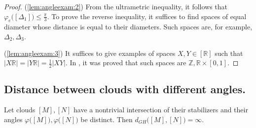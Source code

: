 \documentclass[leqno]{article}
\begin{document}
\begin{proof}
    (\ref{lem:angleexam:2}) From the ultrametric inequality, it follows that \(
    \varphi_e \big([\Delta _1]\big)\le \frac{\pi }{3} \). To prove the reverse
    inequality, it suffices to find spaces of equal diameter whose distance is
    equal to their diameters. Such spaces are, for example, \( \Delta
    _2, \Delta _3 \).

    (\ref{lem:angleexam:3}) It suffices to give examples of spaces \( X,Y\in
    [\mathbb{R}] \) such that \( |X \mathbb{R}| = |Y \mathbb{R}| = \frac 1 2
    |XY|. \) In \cite{mikhailovUnreleased}, it was proved that such
    spaces are \( \mathbb{Z}, \mathbb{R}\times
    [0,1] \).

\end{proof}
\subsection{Distance between clouds with different angles.}
\begin{theorem}
    \label{thm:diffAndDist}
    Let clouds \( [M], [N] \) have a nontrivial intersection of their
    stabilizers and their angles \( \varphi \big([M]\big), \varphi
    \big([N]\big) \) be distinct. Then \( d_{GH} \big([M], [N]\big) =
    \infty \).
\end{theorem}
\end{document}
